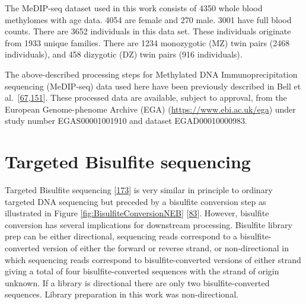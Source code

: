 \documentclass[
]{book}
\begin{document}
The MeDIP-seq dataset used in this work consists of 4350 whole blood methylomes with age data.
4054 are female and 270 male.
3001 have full blood counts.
There are 3652 individuals in this data set.
These individuals originate from 1933 unique families.
There are 1234 monozygotic (MZ) twin pairs (2468 individuals), and 458 dizygotic (DZ) twin pairs (916 individuals).

The above-described processing steps for Methylated DNA Immunoprecipitation sequencing (MeDIP-seq) data used here have been previously described in Bell et al.~{[}\protect\hyperlink{ref-Bell2017a}{67},\protect\hyperlink{ref-Bell2016}{151}{]}.
These processed data are available, subject to approval, from the European Genome-phenome Archive (EGA) (\url{https://www.ebi.ac.uk/ega}) under study number EGAS00001001910 and dataset EGAD00010000983.

\hypertarget{targeted-bisulfite-sequencing}{%
\section{Targeted Bisulfite sequencing}\label{targeted-bisulfite-sequencing}}

Targeted Bisulfite sequencing {[}\protect\hyperlink{ref-Korbie2015}{173}{]} is very similar in principle to ordinary targeted DNA sequencing but preceded by a bisulfite conversion step as illustrated in Figure \ref{fig:BisulfiteConversionNEB} {[}\protect\hyperlink{ref-Bock2010}{83}{]}.
However, bisulfite conversion has several implications for downstream processing.
Bisulfite library prep can be either directional, sequencing reads correspond to a bisulfite-converted version of either the forward or reverse strand, or non-directional in which sequencing reads correspond to bisulfite-converted versions of either strand giving a total of four bisulfite-converted sequences with the strand of origin unknown.
If a library is directional there are only two bisulfite-converted sequences.
Library preparation in this work was non-directional.
\end{document}
